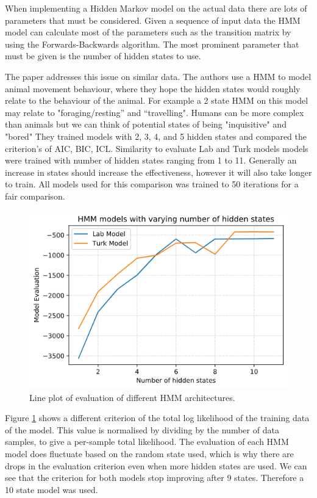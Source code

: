 \documentclass{article}
\begin{document}
When implementing a Hidden Markov model on the actual data there are lots of parameters that must be considered. 
Given a sequence of input data the HMM model can calculate most of the parameters such as the transition matrix by using the Forwards-Backwards algorithm.
The most prominent parameter that must be given is the number of hidden states to use.

The paper \cite{pohle2017selecting} addresses this issue on similar data.
The authors use a HMM to model animal movement behaviour, where they hope the hidden states would roughly relate to the behaviour of the animal.
For example a 2 state HMM on this model may relate to "foraging/resting” and “travelling".
Humans can be more complex than animals but we can think of potential states of being "inquisitive" and "bored"
They trained models with 2, 3, 4, and 5 hidden states and compared the criterion's of AIC, BIC, ICL.
Similarity to evaluate Lab and Turk models models were trained with number of hidden states ranging from 1 to 11.
Generally an increase in states should increase the effectiveness, however it will also take longer to train.
All models used for this comparison was trained to 50 iterations for a fair comparison. 

\begin{figure}[ht]
    \centering
    \includegraphics[scale=0.55]{Images/ModelEvaluation.png}
    \caption{Line plot of evaluation of different HMM architectures.}
    \label{fig:ModleEval}
\end{figure}

Figure \ref{fig:ModleEval} shows a different criterion of the total log likelihood of the training data of the model.
This value is normalised by dividing by the number of data samples, to give a per-sample total likelihood.
The evaluation of each HMM model does fluctuate based on the random state used, which is why there are drops in the evaluation criterion even when more hidden states are used.
We can see that the criterion for both models stop improving after 9 states.
Therefore a 10 state model was used.
\end{document}
